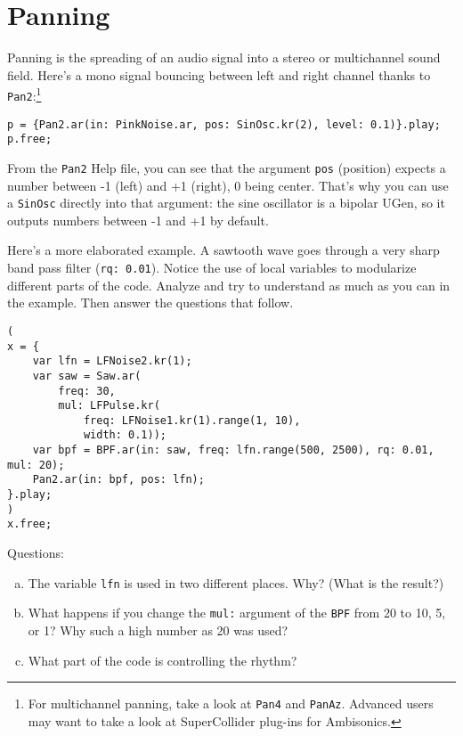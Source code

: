 \section{Panning}

Panning is the spreading of an audio signal into a stereo or multichannel sound field. Here's a mono signal bouncing between left and right channel thanks to \texttt{Pan2}:\footnote{For multichannel panning, take a look at \texttt{Pan4} and \texttt{PanAz}. Advanced users may want to take a look at SuperCollider plug-ins for Ambisonics.}
\begin{lstlisting}[style=SuperCollider-IDE, basicstyle=\scttfamily\footnotesize]
p = {Pan2.ar(in: PinkNoise.ar, pos: SinOsc.kr(2), level: 0.1)}.play;
p.free;
\end{lstlisting}
From the \texttt{Pan2} Help file, you can see that the argument \texttt{pos} (position) expects a number between -1 (left) and +1 (right), 0 being center. That's why you can use a \texttt{SinOsc} directly into that argument: the sine oscillator is a bipolar UGen, so it outputs numbers between -1 and +1 by default.

Here's a more elaborated example. A sawtooth wave goes through a very sharp band pass filter (\texttt{rq: 0.01}). Notice the use of local variables to modularize different parts of the code. Analyze and try to understand as much as you can in the example. Then answer the questions that follow.

\begin{lstlisting}[style=SuperCollider-IDE, basicstyle=\scttfamily\footnotesize]
(
x = {
	var lfn = LFNoise2.kr(1);
	var saw = Saw.ar(
		freq: 30, 
		mul: LFPulse.kr(
			freq: LFNoise1.kr(1).range(1, 10),
			width: 0.1));
	var bpf = BPF.ar(in: saw, freq: lfn.range(500, 2500), rq: 0.01, mul: 20);
	Pan2.ar(in: bpf, pos: lfn);
}.play;
)
x.free;
\end{lstlisting}
 
Questions:
\begin{enumerate}[(a)]
\item The variable \texttt{lfn} is used in two different places. Why? (What is the result?)
\item What happens if you change the \texttt{mul:} argument of the \texttt{BPF} from 20 to 10, 5, or 1? Why such a high number as 20 was used?
\item What part of the code is controlling the rhythm?
\end{enumerate}

